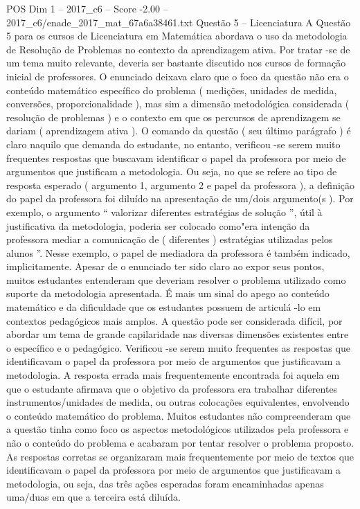 \begin{textsample}{POS Dim 1 – 2017\_c6 – Score -2.00 – 2017\_c6/enade\_2017\_mat\_67a6a38461.txt}
Questão 5 – Licenciatura A Questão 5 para os cursos de Licenciatura em Matemática abordava o uso da metodologia de Resolução de Problemas no contexto da aprendizagem ativa.
Por tratar -se de um tema muito relevante, deveria ser bastante discutido nos cursos de formação inicial de professores.
O enunciado deixava claro que o foco da questão não era o conteúdo matemático específico do problema ( medições, unidades de medida, conversões, proporcionalidade ), mas sim a dimensão metodológica considerada ( resolução de problemas ) e o contexto em que os percursos de aprendizagem se dariam ( aprendizagem ativa ).
O comando da questão ( seu último parágrafo ) é claro naquilo que demanda do estudante, no entanto, verificou -se serem muito frequentes respostas que buscavam identificar o papel da professora por meio de argumentos que justificam a metodologia.
Ou seja, no que se refere ao tipo de resposta esperado ( argumento 1, argumento 2 e papel da professora ), a definição do papel da professora foi diluído na apresentação de um/dois argumento(s ).
Por exemplo, o argumento “ valorizar diferentes estratégias de solução ”, útil à justificativa da metodologia, poderia ser colocado como"era intenção da professora mediar a comunicação de ( diferentes ) estratégias utilizadas pelos alunos ”.
Nesse exemplo, o papel de mediadora da professora é também indicado, implicitamente.
Apesar de o enunciado ter sido claro ao expor seus pontos, muitos estudantes entenderam que deveriam resolver o problema utilizado como suporte da metodologia apresentada.
É mais um sinal do apego ao conteúdo matemático e da dificuldade que os estudantes possuem de articulá -lo em contextos pedagógicos mais amplos.
A questão pode ser considerada difícil, por abordar um tema de grande capilaridade nas diversas dimensões existentes entre o específico e o pedagógico.
Verificou -se serem muito frequentes as respostas que identificavam o papel da professora por meio de argumentos que justificavam a metodologia.
A resposta errada mais frequentemente encontrada foi aquela em que o estudante afirmava que o objetivo da professora era trabalhar diferentes instrumentos/unidades de medida, ou outras colocações equivalentes, envolvendo o conteúdo matemático do problema.
Muitos estudantes não compreenderam que a questão tinha como foco os aspectos metodológicos utilizados pela professora e não o conteúdo do problema e acabaram por tentar resolver o problema proposto.
As respostas corretas se organizaram mais frequentemente por meio de textos que identificavam o papel da professora por meio de argumentos que justificavam a metodologia, ou seja, das três ações esperadas foram encaminhadas apenas uma/duas em que a terceira está diluída.

\end{textsample}
